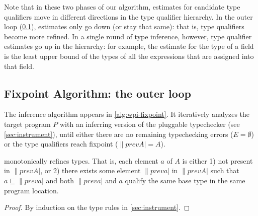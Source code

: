 Note that in these two phases of our algorithm, estimates for
candidate type qualifiers move in different directions in the
type qualifier hierarchy.
%
In the outer loop (\cref{sec:core-algorithm}),
estimates only go down (or stay that same): that is,
type qualifiers become more refined.
%
In a single round of type inference, however, type qualifier
estimates go up in the hierarchy: for example, the estimate
for the type of a field is the least upper bound of the types
of all the expressions that are assigned into that field.



\subsection{Fixpoint Algorithm:  the outer loop}
\label{sec:core-algorithm}



The inference algorithm appears
in \cref{alg:wpi-fixpoint}.   It iteratively analyzes
the target program $P$ with an inferring version of the
pluggable typechecker
(see \cref{sec:instrument}),
until
either there are no remaining typechecking errors
(\ie $E = \emptyset$)
or the
type qualifiers reach fixpoint (\ie $\|prevA| = A$).


\begin{theorem}
 monotonically refines types.  That is,
each element $a$ of $A$ is either 1) not present in $\|prevA|$, or
2) there exists some element $\|preva|$ in $\|prevA|$ such that $a \sqsubseteq \|preva|$
and both $\|preva|$ and $a$ qualify the same base type in the same program location.
\end{theorem}

\begin{proof}
By induction on the type rules in \cref{sec:instrument}.
\end{proof}


